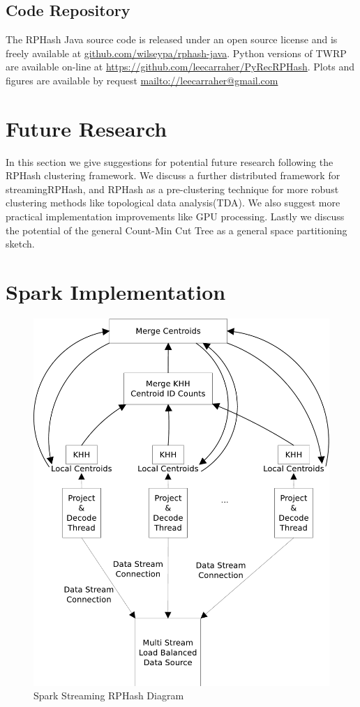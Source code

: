 \subsection{Code Repository}
The \textsf{RPHash} Java source code is released under an open source license and is freely
available at \url{github.com/wilseypa/rphash-java}.  Python versions of \textsf{TWRP} are available on-line at
\url{https://github.com/leecarraher/PyRecRPHash}.  Plots and figures are available by request
\url{mailto://leecarraher@gmail.com}

\section{Future Research}\label{further}
In this section we give suggestions for potential future research following the \textsf{RPHash} clustering framework.  We discuss
a further distributed framework for \textsf{streamingRPHash}, and \textsf{RPHash} as a pre-clustering technique for more robust
clustering methods like topological data analysis(TDA).
We also suggest more practical implementation improvements like GPU processing. Lastly we discuss the potential of the 
general Count-Min Cut Tree as a general space partitioning sketch.

\section{Spark Implementation}

\begin{figure}
    \centerline{\includegraphics[width=.7\textwidth]{figs/sparkrp}}
    \caption{Spark Streaming RPHash Diagram}\label{sparkrp}
\end{figure}

